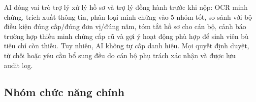 \noindent AI đóng vai trò trợ lý xử lý hồ sơ và trợ lý đồng hành trước khi nộp: OCR minh chứng, trích xuất thông tin, phân loại minh chứng vào 5 nhóm tốt, so sánh với bộ điều kiện đúng cấp/đúng đơn vị/đúng năm, tóm tắt hồ sơ cho cán bộ, cảnh báo trường hợp thiếu minh chứng cấp cũ và gợi ý hoạt động phù hợp để sinh viên bù tiêu chí còn thiếu. Tuy nhiên, AI không tự cấp danh hiệu. Mọi quyết định duyệt, từ chối hoặc yêu cầu bổ sung đều do cán bộ phụ trách xác nhận và được lưu audit log.

\subsection{Nhóm chức năng chính}

\begingroup
\footnotesize
\setlength{\tabcolsep}{3pt}
\renewcommand{\arraystretch}{1.25}

